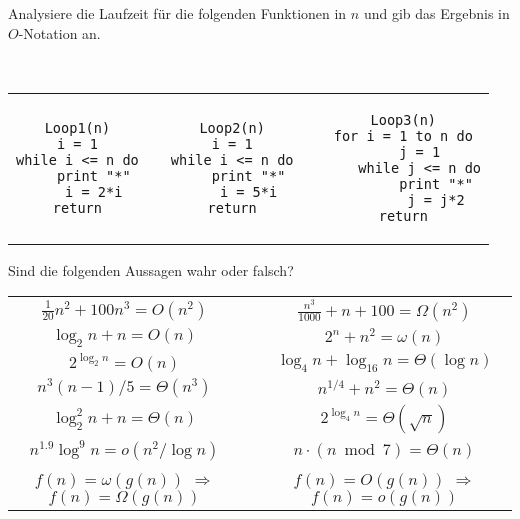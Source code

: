 \documentclass{uebung_cs}
\begin{document}
\begin{aufgabe}
	Analysiere die Laufzeit für die folgenden Funktionen in $n$ und gib das Ergebnis in $O$-Notation an.
	\begin{center}\mbox{}\\[-2\baselineskip]
		\begin{tabular}{ccccc}
\begin{lstlisting}[language={}]
Loop1(n)
i = 1
while i <= n do
	print "*"
	i = 2*i
return
\end{lstlisting}		
		
			&\mbox{}\hspace{2cm}\mbox{}&

\begin{lstlisting}[language={}]
Loop2(n)
i = 1
while i <= n do
	print "*"
	i = 5*i
return
\end{lstlisting}

			
			&\mbox{}\hspace{2cm}\mbox{}&
			
\begin{lstlisting}[language={}]
Loop3(n)
for i = 1 to n do
	j = 1
	while j <= n do
		print "*"
		j = j*2
return
\end{lstlisting}
		\end{tabular}
	\end{center}
\end{aufgabe}

\begin{aufgabe}
	Sind die folgenden Aussagen wahr oder falsch?
	\begin{center}
		\begin{tabular}{ccc}
			$\frac{1}{20}n^2 + 100 n^3 = O(n^2)$
			&\mbox{}\hspace{2cm}\mbox{}&
			$\frac{n^3}{1000} + n + 100 = \Omega(n^2)$\\
			$\log_2 n + n = O(n)$&&
			$2^n + n^2 = \omega(n)$\\
			$2^{\log_2 n} = O(n)$&&
			$\log_4 n + \log_{16} n = \Theta(\log n)$\\
			$n^3(n-1)/5 = \Theta(n^3)$&&
			$n^{1/4} + n^2 = \Theta(n)$\\
			$\log_2^2n + n = \Theta(n)$&&
			$2^{\log_4n} = \Theta(\sqrt{n})$\\
			$n^{1.9}\log^9 n = o(n^2/\log n)$&&
			$n\cdot(n\bmod 7) = \Theta(n)$\\
			$f(n)=\omega(g(n))$
			$\Longrightarrow$
			$f(n)=\Omega(g(n))$&&
			$f(n)=O(g(n))$
			$\Longrightarrow$
			$f(n)=o(g(n))$
		\end{tabular}
	\end{center}
\end{aufgabe}
\end{document}
